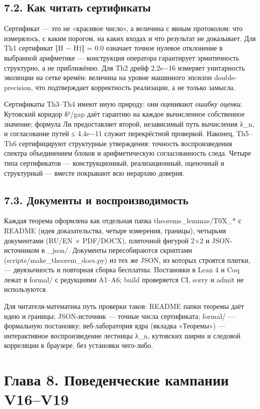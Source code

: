 \documentclass[11pt,a4paper]{article}
\begin{document}
\subsection{7.2. Как читать сертификаты}

Сертификат — это не «красивое число», а величина с явным протоколом: что измерялось, с каким порогом, на каких входах и что результат не доказывает. Для Th1 сертификат ‖H − H†‖ = 0.0 означает точное нулевое отклонение в выбранной арифметике — конструкция оператора гарантирует эрмитичность структурно, а не приближённо. Для Th2 дрейф 2.2e−16 измеряет унитарность эволюции на сетке времён: величина на уровне машинного эпсилон double-precision, что подтверждает корректность реализации, а не только замысла.

Сертификаты Th3–Th4 имеют иную природу: они оценивают \emph{ошибку оценки}. Кутовский коридор δ²/gap даёт гарантию на каждое вычисленное собственное значение; формула Ли предоставляет второй, независимый путь вычисления λ\_n, и согласование путей ≤ 4.4e−11 служит перекрёстной проверкой. Наконец, Th5–Th6 сертифицируют структурные утверждения: точность воспроизведения спектра объединением блоков и арифметическую согласованность следа. Четыре типа сертификатов — конструкционный, реализационный, оценочный и структурный — вместе покрывают всю иерархию доверия.

\subsection{7.3. Документы и воспроизводимость}

Каждая теорема оформлена как отдельная папка theorems\_lemmas/T0X\_* с README (идея доказательства, четыре измерения, границы), четырьмя документами (RU/EN × PDF/DOCX), плиточной фигурой 2×2 и JSON-источником в \_json/. Документы пересобираются скриптами (scripts/make\_theorem\_docs.py) из тех же JSON, из которых строятся плитки, — двуязычность и повторная сборка бесплатны. Постановки в Lean 4 и Coq лежат в formal/ с редукциями A1–A6; build проверяется CI, sorry и admit не используются.

Для читателя-математика путь проверки таков: README папки теоремы даёт идею и границы; JSON-источник — точные числа сертификата; formal/ — формальную постановку; веб-лаборатория ядра (вкладка «Теоремы») — интерактивное воспроизведение лестницы λ\_n, кутовских ширин и следовой корреляции в браузере, без установки чего-либо.

\section{Глава 8. Поведенческие кампании V16–V19}
\end{document}
